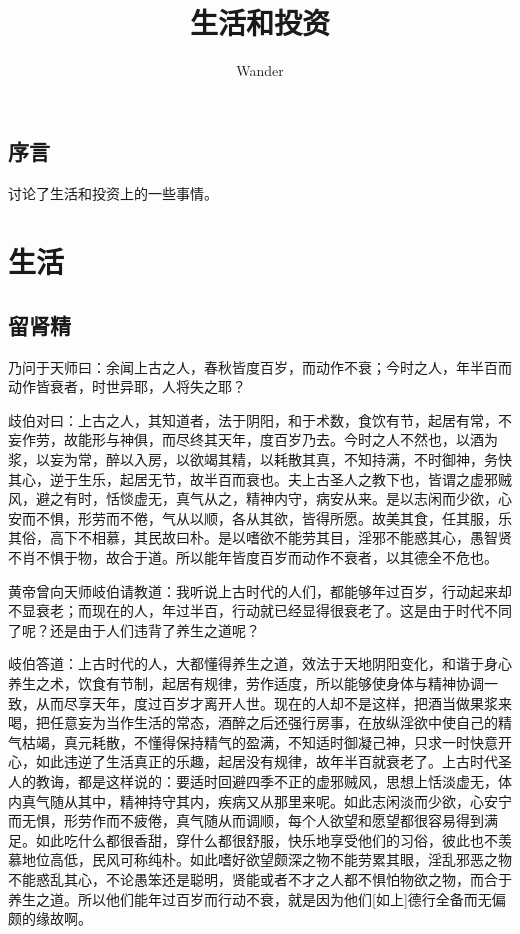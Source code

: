 \documentclass[12pt,oneside]{book}
\title{生活和投资}
\author{Wander}
\begin{document}


\frontmatter 
{}
\chapter*{序言}
讨论了生活和投资上的一些事情。

\setcounter{tocdepth}{2}    
\tableofcontents



\mainmatter
\part{生活}
\chapter{留肾精}
\begin{bookref}[frametitle={\cite{黄帝内经}}]
[黄帝]乃问于天师曰：余闻上古之人，春秋皆度百岁，而动作不衰；今时之人，年半百而动作皆衰者，时世异耶，人将失之耶？

歧伯对曰：上古之人，其知道者，法于阴阳，和于术数，食饮有节，起居有常，不妄作劳，故能形与神俱，而尽终其天年，度百岁乃去。今时之人不然也，以酒为浆，以妄为常，醉以入房，以欲竭其精，以耗散其真，不知持满，不时御神，务快其心，逆于生乐，起居无节，故半百而衰也。夫上古圣人之教下也，皆谓之虚邪贼风，避之有时，恬惔虚无，真气从之，精神内守，病安从来。是以志闲而少欲，心安而不惧，形劳而不倦，气从以顺，各从其欲，皆得所愿。故美其食，任其服，乐其俗，高下不相慕，其民故曰朴。是以嗜欲不能劳其目，淫邪不能惑其心，愚智贤不肖不惧于物，故合于道。所以能年皆度百岁而动作不衰者，以其德全不危也。
\end{bookref}
 
黄帝曾向天师岐伯请教道：我听说上古时代的人们，都能够年过百岁，行动起来却不显衰老；而现在的人，年过半百，行动就已经显得很衰老了。这是由于时代不同了呢？还是由于人们违背了养生之道呢？

岐伯答道：上古时代的人，大都懂得养生之道，效法于天地阴阳变化，和谐于身心养生之术，饮食有节制，起居有规律，劳作适度，所以能够使身体与精神协调一致，从而尽享天年，度过百岁才离开人世。现在的人却不是这样，把酒当做果浆来喝，把任意妄为当作生活的常态，酒醉之后还强行房事，在放纵淫欲中使自己的精气枯竭，真元耗散，不懂得保持精气的盈满，不知适时御凝己神，只求一时快意开心，如此违逆了生活真正的乐趣，起居没有规律，故年半百就衰老了。上古时代圣人的教诲，都是这样说的：要适时回避四季不正的虚邪贼风，思想上恬淡虚无，体内真气随从其中，精神持守其内，疾病又从那里来呢。如此志闲淡而少欲，心安宁而无惧，形劳作而不疲倦，真气随从而调顺，每个人欲望和愿望都很容易得到满足。如此吃什么都很香甜，穿什么都很舒服，快乐地享受他们的习俗，彼此也不羡慕地位高低，民风可称纯朴。如此嗜好欲望颇深之物不能劳累其眼，淫乱邪恶之物不能惑乱其心，不论愚笨还是聪明，贤能或者不才之人都不惧怕物欲之物，而合于养生之道。所以他们能年过百岁而行动不衰，就是因为他们[如上]德行全备而无偏颇的缘故啊。
\end{document}
